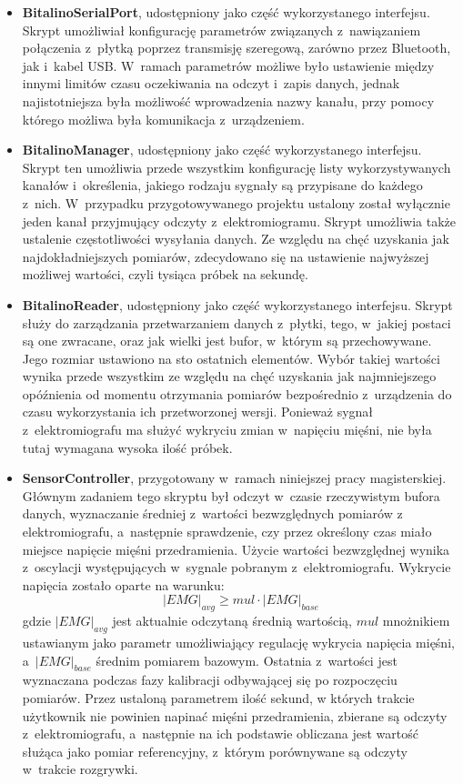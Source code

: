 \begin{itemize}
	\item \textbf{BitalinoSerialPort}, udostępniony jako część wykorzystanego interfejsu. Skrypt umożliwiał konfigurację parametrów związanych z~nawiązaniem połączenia z~płytką poprzez transmisję szeregową, zarówno przez Bluetooth, jak i~kabel USB. W~ramach parametrów możliwe było ustawienie między innymi limitów czasu oczekiwania na odczyt i~zapis danych, jednak najistotniejsza była możliwość wprowadzenia nazwy kanału, przy pomocy którego możliwa była komunikacja z~urządzeniem. 
	\item \textbf{BitalinoManager}, udostępniony jako część wykorzystanego interfejsu. Skrypt ten umożliwia przede wszystkim konfigurację listy wykorzystywanych kanałów i~określenia, jakiego rodzaju sygnały są przypisane do każdego z~nich. W~przypadku przygotowywanego projektu ustalony został wyłącznie jeden kanał przyjmujący odczyty z~elektromiogramu. Skrypt umożliwia także ustalenie częstotliwości wysyłania danych. Ze względu na chęć uzyskania jak najdokładniejszych pomiarów, zdecydowano się na ustawienie najwyższej możliwej wartości, czyli tysiąca próbek na sekundę.
	\item \textbf{BitalinoReader}, udostępniony jako część wykorzystanego interfejsu. Skrypt służy do zarządzania przetwarzaniem danych z~płytki, tego, w~jakiej postaci są one zwracane, oraz jak wielki jest bufor, w~którym są przechowywane. Jego rozmiar ustawiono na sto ostatnich elementów. Wybór takiej wartości wynika przede wszystkim ze względu na chęć uzyskania jak najmniejszego opóźnienia od momentu otrzymania pomiarów bezpośrednio z~urządzenia do czasu wykorzystania ich przetworzonej wersji. Ponieważ sygnał z~elektromiografu ma służyć wykryciu zmian w~napięciu mięśni, nie była tutaj wymagana wysoka ilość próbek.
	\item \textbf{SensorController}, przygotowany w~ramach niniejszej pracy magisterskiej. Głównym zadaniem tego skryptu był odczyt w~czasie rzeczywistym bufora danych, wyznaczanie średniej z~wartości bezwzględnych pomiarów z elektromiografu, a~następnie sprawdzenie, czy przez określony czas miało miejsce napięcie mięśni przedramienia. Użycie wartości bezwzględnej wynika z~oscylacji występujących w~sygnale pobranym z~elektromiografu. Wykrycie napięcia zostało oparte na warunku:
	$$
	|EMG|_{avg} \geq mul \cdot |EMG|_{base}
	$$
	gdzie $|EMG|_{avg}$ jest aktualnie odczytaną średnią wartością, $mul$ mnożnikiem ustawianym jako parametr umożliwiający regulację wykrycia napięcia mięśni, a~$|EMG|_{base}$ średnim pomiarem bazowym. Ostatnia z~wartości jest wyznaczana podczas fazy kalibracji odbywającej się po rozpoczęciu pomiarów. Przez ustaloną parametrem ilość sekund, w których trakcie użytkownik nie powinien napinać mięśni przedramienia, zbierane są odczyty z~elektromiografu, a~następnie na ich podstawie obliczana jest wartość służąca jako pomiar referencyjny, z~którym porównywane są odczyty w~trakcie rozgrywki.
\end{itemize}

